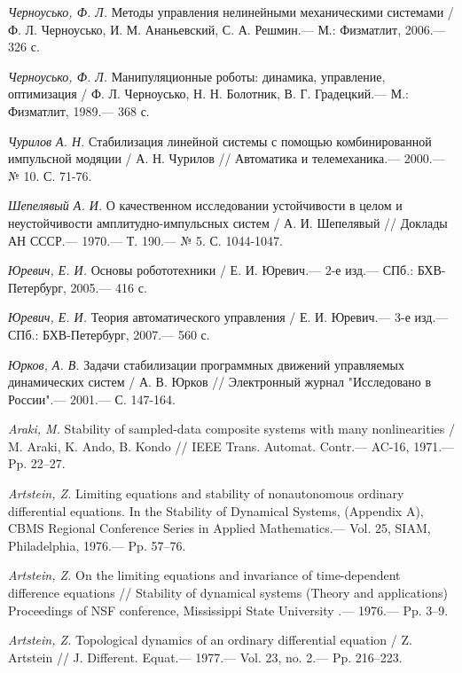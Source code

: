 \begin{thebibliography}{10}
	{\it Черноусько, Ф. Л.} Методы управления нелинейными механическими системами /
	Ф. Л. Черноусько, И. М. Ананьевский, С. А. Решмин.— М.: Физматлит, 2006.— 326 с.
	
	{\it Черноусько, Ф. Л.} Манипуляционные роботы: динамика, управление, оптимизация /
	Ф. Л. Черноусько, Н. Н. Болотник, В. Г. Градецкий.— М.: Физматлит, 1989.— 368 с.
	
	{\it Чурилов А. Н.} Стабилизация линейной системы с помощью комбинированной импульсной модяции /
	А. Н. Чурилов // Автоматика и телемеханика.— 2000.— № 10. С. 71-76.
	
	{\it Шепелявый А. И.} О качественном исследовании устойчивости в целом и неустойчивости амплитудно-импульсных систем /
	А. И. Шепелявый // Доклады АН СССР.— 1970.— Т. 190.— № 5. С. 1044-1047.
	
	
	{\it Юревич, Е. И.} Основы робототехники / Е. И. Юревич.— 2-е изд.— СПб.:
	БХВ-Петербург, 2005.— 416 с.
	
	{\it Юревич, Е. И.} Теория автоматического управления / Е. И. Юревич.— 3-е изд.— СПб.:
	БХВ-Петербург, 2007.— 560 с.
	
	{\it Юрков, А. В.} Задачи стабилизации программных движений управляемых динамических систем / А. В. Юрков // Электронный журнал "Исследовано в России".— 2001.— С. 147-164.
	
	{\it Araki, M.} Stability of sampled-data composite systems with many nonlinearities / M. Araki, K. Ando, B. Kondo // IEEE Trans. Automat. Contr.— AC-16, 1971.— Pp. 22–27.
	
	{\it Artstein, Z.} Limiting equations and stability of nonautonomous ordinary differential equations. In the Stability of Dynamical Systems, (Appendix A), CBMS Regional Conference Series in Applied Mathematics.— Vol. 25, SIAM, Philadelphia, 1976.— Pp. 57–76.
	
	{\it Artstein, Z.} On the limiting equations and invariance of time-dependent difference equations // Stability of dynamical systems (Theory and applications) Proceedings of NSF conference, Mississippi State University .— 1976.— Pp. 3–9.
	
	{\it Artstein, Z.} Topological dynamics of an ordinary differential equation / Z. Artstein // J.
	Different. Equat.— 1977.— Vol. 23, no. 2.— Pp. 216–223.
	

\end{thebibliography}
